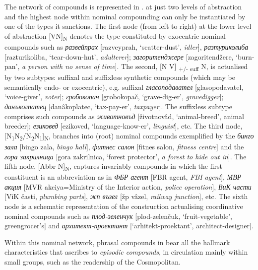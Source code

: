 \documentclass[output=paper]{LSP/langsci}
\begin{document}
The  network of compounds is represented in . at just two levels of abstraction and the highest node within nominal compounding can only be instantiated by one of the types it sanctions. The first node (from left to right) at the lower level of abstraction [VN]\textsubscript{N} denotes the type constituted by exocentric nominal compounds such as \textit{{развейпрах} }[razveyprah, ‘scatter-dust’, \textit{idler}], \textit{{разтуриколиба}} [razturikoliba, ‘tear-down-hut’, \textit{adulterer}]; \textit{{загоритен\-джере}} [zagoritendžere, ‘burn-pan’, \textit{a person with no sense of time}]. The second, [N V] \textsubscript{+/- suff} N, is actualised by two subtypes: suffixal and suffixless synthetic compounds (which may be semantically endo- or exocentric), e.g. suffixal \textit{{гласопо\-давател}} [glasopodavatel, ‘voice-giver’, \textit{voter}]; \textit{{гробокопач}} [grobokopač, ‘grave-dig-er’, \textit{gravedigger}]; {\textit{данъколпатец} [danâkoplatec, ‘tax-pay-er’,} \textit{taxpayer}]. The suffixless subtype comprises such compounds as \textit{{животновъд}} [životnovâd, ‘an\-i\-mal-breed’, animal breeder]; \textit{{езиковед}} [ezikoved, ‘language-know-er’, \textit{linguist}], etc. The third node, [N\textsubscript{1}N\textsubscript{2}/N\textsubscript{2}N\textsubscript{1}]\textsubscript{N}, branches into  (root) nominal compounds exemplified by the  \textit{{бинго зала} }[bingo zala, \textit{bingo hall}], \textit{{фитнес салон} }[fitnes salon, \textit{fitness centre}] and the  \textit{{гора закрилница} }[gora zakrilnica, ‘forest protector’, \textit{a forest to hide out in}]. The fifth node, [Abbr N]\textsubscript{N}, captures invariably  compounds in which the first constituent is an abbreviation as in \textit{{ФБР агент}} [FBR agent, \textit{FBI agent}], \textit{{МВР акция} }[MVR akciya=Ministry of the Interior action, \textit{police operation}], \textit{{ВиК части} }[ViK časti, \textit{plumbing parts}], \textit{{жп възел} }[žp vâzel, \textit{railway junction}], etc. The sixth node is a schematic representation of the construction actualising coordinative nominal compounds such as \textit{{плод-зеленчук} }[plod-zelenčuk, ‘fruit-vegetable’, greengrocer's] and \textit{{архитект-проектант} }[‘arhitekt-proektant’, architect-designer].

Within this nominal network, phrasal compounds in  bear all the hallmark characteristics that \citet[9]{Heringer1984} ascribes to \textit{episodic compounds}, in circulation mainly within small groups, such as the readership of the  Cosmopolitan. 
\end{document}
